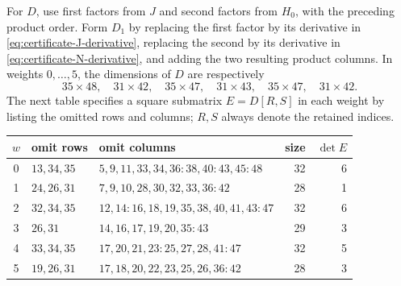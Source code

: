 For $D$, use first factors from $J$ and second factors from $H_0$,
with the preceding product order.  Form $D_1$ by replacing the first
factor by its derivative in
\eqref{eq:certificate-J-derivative}, replacing the second by its
derivative in \eqref{eq:certificate-N-derivative}, and adding the
two resulting product columns.  In weights $0,\ldots,5$, the
dimensions of $D$ are respectively
\[
 35\times48,\quad31\times42,\quad35\times47,\quad
 31\times43,\quad35\times47,\quad31\times42.
\]
The next table specifies a square submatrix $E=D[R,S]$ in each
weight by listing the omitted rows and columns; $R,S$ always
denote the retained indices.
\begin{center}
\small
\setlength{\tabcolsep}{4pt}
\begin{tabular}{c l l r r}
\toprule
$w$&omit rows&omit columns&size&$\det E$\\
\midrule
0&$13,34,35$&$5,9,11,33,34,36{:}38,40{:}43,45{:}48$&32&6\\
1&$24,26,31$&$7,9,10,28,30,32,33,36{:}42$&28&1\\
2&$32,34,35$&$12,14{:}16,18,19,35,38,40,41,43{:}47$&32&6\\
3&$26,31$&$14,16,17,19,20,35{:}43$&29&3\\
4&$33,34,35$&$17,20,21,23{:}25,27,28,41{:}47$&32&5\\
5&$19,26,31$&$17,18,20,22,23,25,26,36{:}42$&28&3\\
\bottomrule
\end{tabular}
\end{center}

